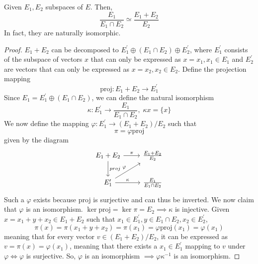   \begin{proposition}
    Given $E_1, E_2$ subspaces of $E$. Then, 
    \begin{equation}
      \frac{E_1}{E_1 \cap E_2} \simeq \frac{E_1 + E_2}{E_2}
    \end{equation}
    In fact, they are naturally isomorphic. 
  \end{proposition}
  \begin{proof}
    $E_1 + E_2$ can be decomposed to $E_1^\prime \oplus (E_1 \cap E_2) \oplus E_2^\prime$, where $E_1^\prime$ consists of the subspace of vectors $x$ that can only be expressed as $x = x_1, x_1 \in E_1$ and $E_2^\prime$ are vectors that can only be expressed as $x = x_2, x_2 \in E_2$. Define the projection mapping
    \begin{equation}
      \text{proj}: E_1 + E_2 \longrightarrow E_1^\prime
    \end{equation}
    Since $E_1 = E_1^\prime \oplus (E_1 \cap E_2)$, we can define the natural isomorphism 
    \begin{equation}
      \kappa: E_1^\prime \longrightarrow \frac{E_1}{E_1 \cap E_2}, \; \kappa{x} = \{x\}
    \end{equation}
    We now define the mapping $\varphi: E_1^\prime \longrightarrow (E_1 + E_2) / E_2$ such that
    \begin{equation}
      \pi = \varphi \text{proj}
    \end{equation}
    given by the diagram 
    \[\begin{tikzcd} 
        E_1 + E_2 \arrow{d}{proj} \arrow{r}{\pi} & \frac{E_1 + E_2}{E_2} \\
        E_1^\prime \arrow{ru}{\varphi} \arrow{r}{\kappa} & \frac{E_1}{E_1 \cap E_2}
    \end{tikzcd}\]
    Such a $\varphi$ exists because proj is surjective and can thus be inverted. We now claim that $\varphi$ is an isomorphism. $\ker{\text{proj}} = \ker{\pi} = E_2 \implies \kappa$ is injective. Given $x = x_1 + y + x_2 \in E_1 + E_2$ such that $x_1 \in E_1^\prime, y \in E_1 \cap E_2, x_2 \in E_2^\prime$, 
    \begin{equation}
      \pi(x) = \pi(x_1 + y + x_2) = \pi(x_1) = \varphi \text{proj} (x_1) = \varphi (x_1)
    \end{equation}
    meaning that for every vector $v \in (E_1 + E_2) / E_2$, it can be expressed as $v = \pi (x) = \varphi (x_1)$, meaning that there exists a $x_1 \in E_1^\prime$ mapping to $v$ under $\varphi \iff \varphi$ is surjective. So, $\varphi$ is an isomorphism $\implies \varphi \kappa^{-1}$ is an isomorphism.  
  \end{proof}

